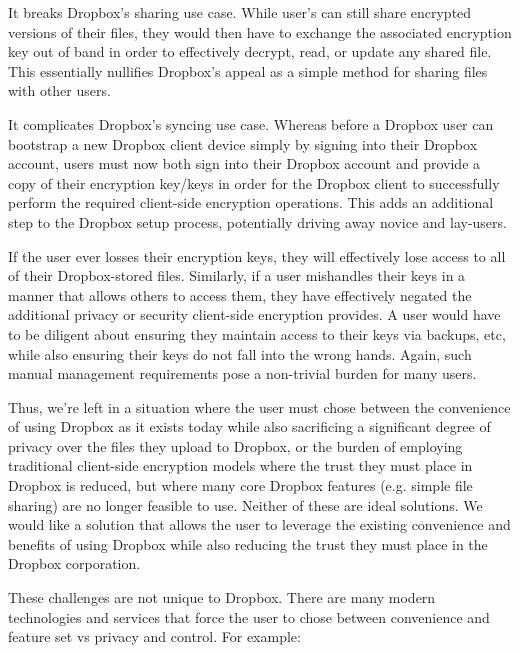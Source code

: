 \begin{packed_enum}
\item It breaks Dropbox's sharing use case. While user's can still
  share encrypted versions of their files, they would then have to
  exchange the associated encryption key out of band in order to
  effectively decrypt, read, or update any shared file. This
  essentially nullifies Dropbox's appeal as a simple method for
  sharing files with other users.
\item It complicates Dropbox's syncing use case. Whereas before a
  Dropbox user can bootstrap a new Dropbox client device simply by
  signing into their Dropbox account, users must now both sign into
  their Dropbox account and provide a copy of their encryption
  key/keys in order for the Dropbox client to successfully perform the
  required client-side encryption operations. This adds an additional
  step to the Dropbox setup process, potentially driving away novice
  and lay-users.
\item If the user ever losses their encryption keys, they will
  effectively lose access to all of their Dropbox-stored
  files. Similarly, if a user mishandles their keys in a manner that
  allows others to access them, they have effectively negated the
  additional privacy or security client-side encryption provides. A
  user would have to be diligent about ensuring they maintain access
  to their keys via backups, etc, while also ensuring their keys do
  not fall into the wrong hands. Again, such manual management
  requirements pose a non-trivial burden for many users.
\end{packed_enum}

Thus, we're left in a situation where the user must chose between the
convenience of using Dropbox as it exists today while also sacrificing
a significant degree of privacy over the files they upload to Dropbox,
or the burden of employing traditional client-side encryption models
where the trust they must place in Dropbox is reduced, but where many
core Dropbox features (e.g. simple file sharing) are no longer
feasible to use. Neither of these are ideal solutions. We would like a
solution that allows the user to leverage the existing convenience and
benefits of using Dropbox while also reducing the trust they must
place in the Dropbox corporation.

These challenges are not unique to Dropbox. There are many modern
technologies and services that force the user to chose between
convenience and feature set vs privacy and control. For example:

